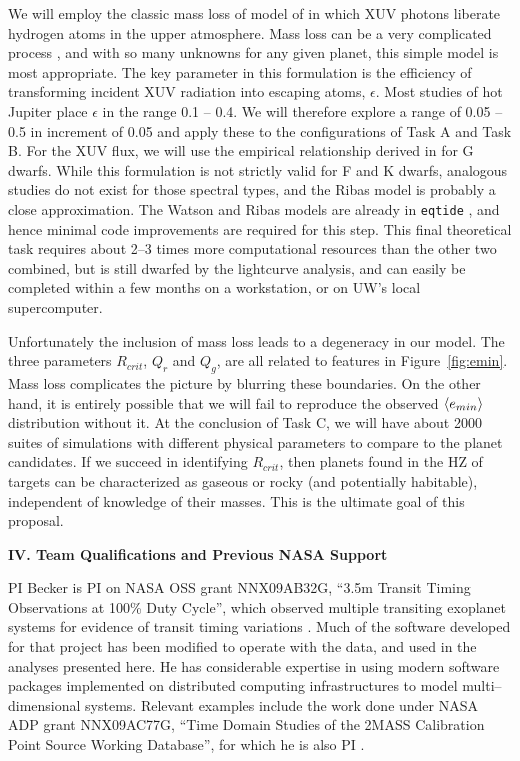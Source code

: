 We will employ the classic mass loss of model of \cite{Watson81} in
which XUV photons liberate hydrogen atoms in the upper atmosphere.
Mass loss can be a very complicated process
\citep{Yelle04,Lammer07,Khodachenko07,Leitzinger11,Lammer13}, and with
so many unknowns for any given planet, this simple model is most
appropriate.  The key parameter in this formulation is the efficiency
of transforming incident XUV radiation into escaping atoms,
$\epsilon$.  Most studies of hot Jupiter place $\epsilon$ in the range
0.1 -- 0.4.  We will therefore explore a range of 0.05 -- 0.5 in
increment of 0.05 and apply these to the configurations of Task A and
Task B.  For the XUV flux, we will use the empirical relationship
derived in \cite{Ribas05} for G dwarfs.  While this formulation is not
strictly valid for F and K dwarfs, analogous studies do not exist for
those spectral types, and the Ribas model is probably a close
approximation.  The Watson and Ribas models are already in
\texttt{eqtide} \citep{Barnes13}, and hence minimal code improvements
are required for this step.  This final theoretical task requires
about 2--3 times more computational resources than the other two
combined, but is still dwarfed by the \kepler lightcurve analysis, and
can easily be completed within a few months on a workstation, or on
UW's local supercomputer.

Unfortunately the inclusion of mass loss leads to a degeneracy in our
model.  The three parameters $R_{crit}$, $Q_r$ and $Q_g$, are all
related to features in Figure~\ref{fig:emin}.  Mass loss complicates
the picture by blurring these boundaries.  On the other hand, it is
entirely possible that we will fail to reproduce the observed
$\left< e_{min} \right>$ distribution without it.  At the conclusion of Task C,
we will have about 2000 suites of simulations with different physical
parameters to compare to the
\kepler planet candidates.  If we succeed in identifying $R_{crit}$,
then planets found in the HZ of \kepler targets can be characterized
as gaseous or rocky (and potentially habitable), independent of
knowledge of their masses.  This is the ultimate goal of this
proposal.

\bigskip
\centerline{\bf IV. Team Qualifications and Previous NASA Support}
\smallskip

PI Becker is PI on NASA OSS grant NNX09AB32G, ``3.5m Transit Timing
Observations at 100\% Duty Cycle'', which observed multiple transiting
exoplanet systems for evidence of transit timing variations
\citep{2011ApJ...731..123K, 2013ApJ...764....8K, 2013ApJ...764L..17B,
  2013arXiv1304.5713K}.  Much of the software developed for that
project has been modified to operate with the \kepler data, and used in
the analyses presented here.  He has considerable expertise in using
modern software packages implemented on distributed computing
infrastructures to model multi--dimensional systems.  Relevant
examples include the work done under NASA ADP grant NNX09AC77G, ``Time
Domain Studies of the 2MASS Calibration Point Source Working
Database'', for which he is also PI
\citep{2012ApJ...748...58D,2013ApJ...764...62D}.

